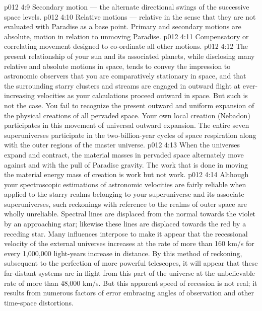 \vs p012 4:9 \bibnobreakspace Secondary motion --- the alternate directional swings of the successive space levels.
\vs p012 4:10 \bibnobreakspace Relative motions --- relative in the sense that they are not evaluated with Paradise as a base point. Primary and secondary motions are absolute, motion in relation to unmoving Paradise.
\vs p012 4:11 \bibnobreakspace Compensatory or correlating movement designed to co\hyp{}ordinate all other motions.
\vs p012 4:12 \pc The present relationship of your sun and its associated planets, while disclosing many relative and absolute motions in space, tends to convey the impression to astronomic observers that you are comparatively stationary in space, and that the surrounding starry clusters and streams are engaged in outward flight at ever\hyp{}increasing velocities as your calculations proceed outward in space. But such is not the case. You fail to recognize the present outward and uniform expansion of the physical creations of all pervaded space. Your own local creation (Nebadon) participates in this movement of universal outward expansion. The entire seven superuniverses participate in the two\hyp{}billion\hyp{}year cycles of space respiration along with the outer regions of the master universe.
\vs p012 4:13 When the universes expand and contract, the material masses in pervaded space alternately move against and with the pull of Paradise gravity. The work that is done in moving the material energy mass of creation is  work but not  work.
\vs p012 4:14 \pc Although your spectroscopic estimations of astronomic velocities are fairly reliable when applied to the starry realms belonging to your superuniverse and its associate superuniverses, such reckonings with reference to the realms of outer space are wholly unreliable. Spectral lines are displaced from the normal towards the violet by an approaching star; likewise these lines are displaced towards the red by a receding star. Many influences interpose to make it appear that the recessional velocity of the external universes increases at the rate of more than 160 km/s for every 1,000,000 light\hyp{}years increase in distance. By this method of reckoning, subsequent to the perfection of more powerful telescopes, it will appear that these far\hyp{}distant systems are in flight from this part of the universe at the unbelievable rate of more than 48,000 km/s. But this apparent speed of recession is not real; it results from numerous factors of error embracing angles of observation and other time\hyp{}space distortions.
